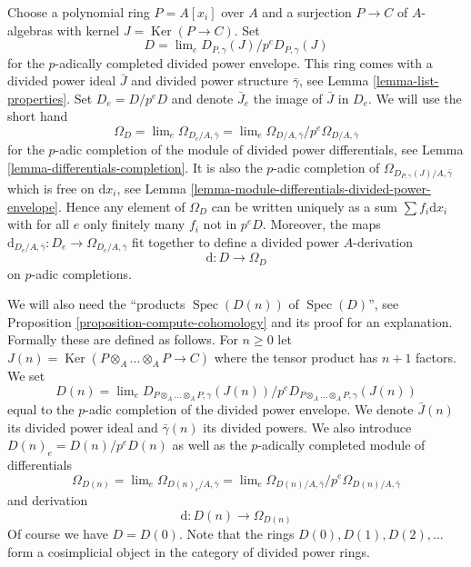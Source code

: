 \documentclass{stacks-project}
\theoremstyle{plain}
\theoremstyle{definition}
\theoremstyle{remark}
\numberwithin{equation}{subsection}
\def\lim{\mathop{\mathrm{lim}}\nolimits}
\def\Spec{\mathop{\mathrm{Spec}}}
\def\Ker{\mathop{\mathrm{Ker}}}
\begin{document}
\medskip\noindent
Choose a polynomial ring $P = A[x_i]$ over $A$ and a surjection $P \to C$
of $A$-algebras with kernel $J = \Ker(P \to C)$. Set
\begin{equation}
\label{equation-D}
D = \lim_e D_{P, \gamma}(J) / p^eD_{P, \gamma}(J)
\end{equation}
for the $p$-adically completed divided power envelope.
This ring comes with a divided power ideal $\bar J$ and divided power
structure $\bar \gamma$, see Lemma \ref{lemma-list-properties}.
Set $D_e = D/p^eD$ and denote $\bar J_e$ the image of $\bar J$ in $D_e$.
We will use the short hand
\begin{equation}
\label{equation-omega-D}
\Omega_D = \lim_e \Omega_{D_e/A, \bar\gamma} =
\lim_e \Omega_{D/A, \bar\gamma}/p^e\Omega_{D/A, \bar\gamma}
\end{equation}
for the $p$-adic completion of the module of divided power differentials,
see Lemma \ref{lemma-differentials-completion}.
It is also the $p$-adic completion of
$\Omega_{D_{P, \gamma}(J)/A, \bar\gamma}$
which is free on $\text{d}x_i$, see
Lemma \ref{lemma-module-differentials-divided-power-envelope}.
Hence any element of $\Omega_D$ can be written uniquely as a sum
$\sum f_i\text{d}x_i$ with for all $e$ only finitely many $f_i$
not in $p^eD$. Moreover, the maps
$\text{d}_{D_e/A, \bar\gamma} : D_e \to \Omega_{D_e/A, \bar\gamma}$
fit together to define a divided power $A$-derivation
\begin{equation}
\label{equation-derivation-D}
\text{d} : D \longrightarrow \Omega_D
\end{equation}
on $p$-adic completions.

\medskip\noindent
We will also need the ``products $\Spec(D(n))$ of $\Spec(D)$'', see
Proposition \ref{proposition-compute-cohomology} and its proof for an
explanation. Formally these are defined as follows. For $n \geq 0$ let
$J(n) = \Ker(P \otimes_A \ldots \otimes_A P \to C)$ where
the tensor product has $n + 1$ factors. We set
\begin{equation}
\label{equation-Dn}
D(n) = \lim_e
D_{P \otimes_A \ldots \otimes_A P, \gamma}(J(n))/
p^eD_{P \otimes_A \ldots \otimes_A P, \gamma}(J(n))
\end{equation}
equal to the $p$-adic completion of the divided power envelope.
We denote $\bar J(n)$ its divided power ideal and $\bar \gamma(n)$
its divided powers. We also introduce $D(n)_e = D(n)/p^eD(n)$ as well
as the $p$-adically completed module of differentials
\begin{equation}
\label{equation-omega-Dn}
\Omega_{D(n)} = \lim_e \Omega_{D(n)_e/A, \bar\gamma} =
\lim_e \Omega_{D(n)/A, \bar\gamma}/p^e\Omega_{D(n)/A, \bar\gamma}
\end{equation}
and derivation
\begin{equation}
\label{equation-derivation-Dn}
\text{d} : D(n) \longrightarrow \Omega_{D(n)}
\end{equation}
Of course we have $D = D(0)$. Note that the rings $D(0), D(1), D(2), \ldots$
form a cosimplicial object in the category of divided power rings.
\end{document}
